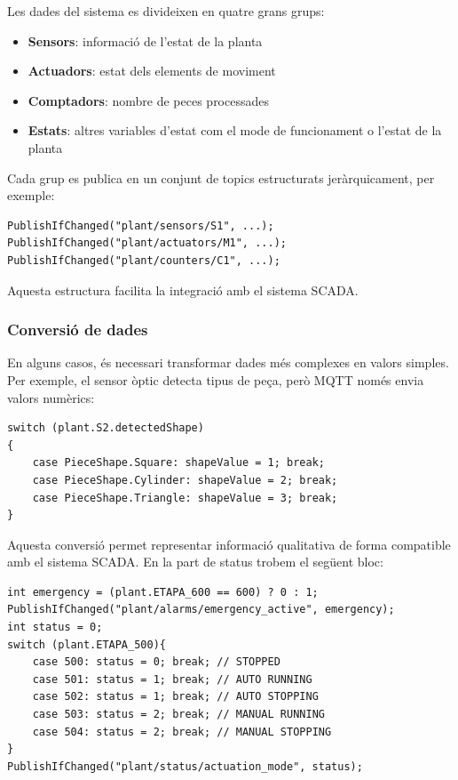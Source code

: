 \documentclass[12pt,a4paper]{report}
\begin{document}
Les dades del sistema es divideixen en quatre grans grups:

\begin{itemize}
    \item \textbf{Sensors}: informació de l'estat de la planta
    \item \textbf{Actuadors}: estat dels elements de moviment
    \item \textbf{Comptadors}: nombre de peces processades
    \item \textbf{Estats}: altres variables d'estat com el mode de funcionament o l'estat de la planta
\end{itemize}

Cada grup es publica en un conjunt de topics estructurats jeràrquicament, per exemple:

\begin{lstlisting}[language=CSharp]
PublishIfChanged("plant/sensors/S1", ...);
PublishIfChanged("plant/actuators/M1", ...);
PublishIfChanged("plant/counters/C1", ...);
\end{lstlisting}

Aquesta estructura facilita la integració amb el sistema SCADA.

\subsubsection{Conversió de dades}

En alguns casos, és necessari transformar dades més complexes en valors simples. Per exemple, el sensor òptic detecta tipus de peça, però MQTT només envia valors numèrics:

\begin{lstlisting}[language=CSharp]
switch (plant.S2.detectedShape)
{
    case PieceShape.Square: shapeValue = 1; break;
    case PieceShape.Cylinder: shapeValue = 2; break;
    case PieceShape.Triangle: shapeValue = 3; break;
}
\end{lstlisting}

Aquesta conversió permet representar informació qualitativa de forma compatible amb el sistema SCADA. En la part de status trobem el següent bloc:
\begin{lstlisting}[language=CSharp]
int emergency = (plant.ETAPA_600 == 600) ? 0 : 1;
PublishIfChanged("plant/alarms/emergency_active", emergency);
int status = 0;
switch (plant.ETAPA_500){
    case 500: status = 0; break; // STOPPED
    case 501: status = 1; break; // AUTO RUNNING
    case 502: status = 1; break; // AUTO STOPPING
    case 503: status = 2; break; // MANUAL RUNNING
    case 504: status = 2; break; // MANUAL STOPPING
}
PublishIfChanged("plant/status/actuation_mode", status);
\end{lstlisting}
 
\end{document}
